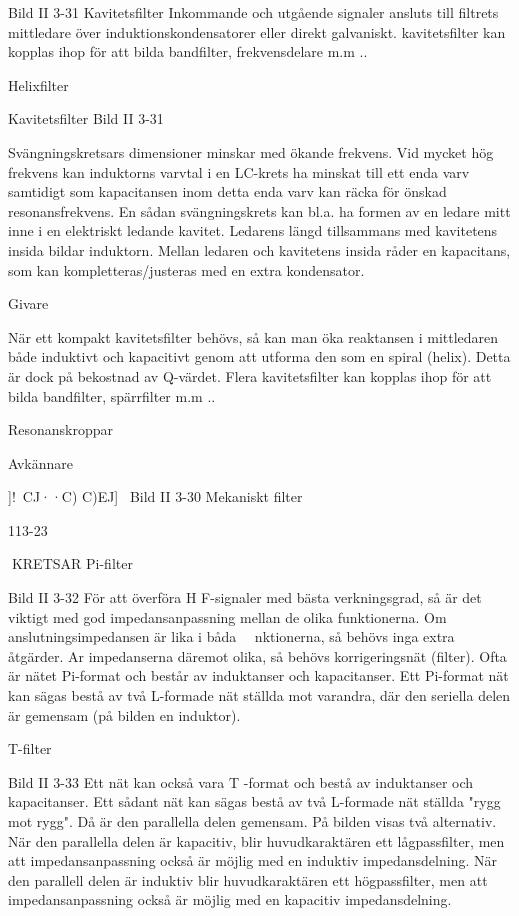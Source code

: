 {{{Bild II 3-31 Kavitetsfilter
Inkommande och utgående signaler ansluts till filtrets mittledare över induktionskondensatorer eller direkt galvaniskt.
kavitetsfilter kan kopplas ihop för att
bilda bandfilter, frekvensdelare m.m ..

Helixfilter

Kavitetsfilter
Bild II 3-31

Svängningskretsars dimensioner minskar
med ökande frekvens. Vid mycket hög frekvens kan induktorns varvtal i en LC-krets ha
minskat till ett enda varv samtidigt som kapacitansen inom detta enda varv kan räcka
för önskad resonansfrekvens.
En sådan svängningskrets kan bl.a. ha
formen av en ledare mitt inne i en elektriskt
ledande kavitet. Ledarens längd tillsammans
med kavitetens insida bildar induktorn. Mellan ledaren och kavitetens insida råder en
kapacitans, som kan kompletteras/justeras
med en extra kondensator.

Givare

När ett kompakt kavitetsfilter behövs, så kan
man öka reaktansen i mittledaren både induktivt och kapacitivt genom att utforma den
som en spiral (helix). Detta är dock på bekostnad av Q-värdet. Flera kavitetsfilter kan
kopplas ihop för att bilda bandfilter, spärrfilter m.m ..

Resonanskroppar

Avkännare

]!~CJ··C) C)EJ]~
Bild II 3-30 Mekaniskt filter

113-23

KRETSAR
Pi-filter

Bild II 3-32
För att överföra H F-signaler med bästa verkningsgrad, så är det viktigt med god impedansanpassning mellan de olika funktionerna. Om anslutningsimpedansen är lika i båda
~~nktionerna, så behövs inga extra åtgärder.
Ar impedanserna däremot olika, så behövs
korrigeringsnät (filter).
Ofta är nätet Pi-format och består av
induktanser och kapacitanser. Ett Pi-format
nät kan sägas bestå av två L-formade nät
ställda mot varandra, där den seriella delen
är gemensam (på bilden en induktor).

T-filter

Bild II 3-33
Ett nät kan också vara T -format och bestå av
induktanser och kapacitanser. Ett sådant
nät kan sägas bestå av två L-formade nät
ställda "rygg mot rygg". Då är den parallella
delen gemensam. På bilden visas två alternativ.
När den parallella delen är kapacitiv, blir
huvudkaraktären ett lågpassfilter, men att
impedansanpassning också är möjlig med
en induktiv impedansdelning.
När den parallell delen är induktiv blir
huvudkaraktären ett högpassfilter, men att
impedansanpassning också är möjlig med
en kapacitiv impedansdelning.

}}}
